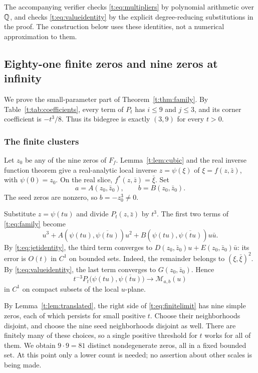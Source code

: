 \documentclass[UTF8,11pt]{ctexart}
\theoremstyle{definition}
\numberwithin{equation}{section}
\begin{document}
The accompanying verifier checks \eqref{t:eq:multipliers} by polynomial
arithmetic over $\mathbb Q$, and checks \eqref{t:eq:valueidentity} by the
explicit degree-reducing substitutions in the proof. The construction
below uses these identities, not a numerical approximation to them.

\subsection{Eighty-one finite zeros and nine zeros at infinity}\label{t:sec:construction}

We prove the small-parameter part of Theorem~\ref{t:thm:family}.
By Table~\ref{t:tab:coefficients}, every term of $P_t$ has
$i\le9$ and $j\le3$, and its corner coefficient is $-t^3/8$. Thus
its bidegree is exactly $(3,9)$ for every $t>0$.

\subsubsection{The finite clusters}
Let $z_0$ be any of the nine zeros of $F_f$. Lemma~\ref{t:lem:cubic}
and the real inverse function theorem give a real-analytic local
inverse $z=\psi(\xi)$ of $\xi=f(z,\bar z)$, with $\psi(0)=z_0$.
On the real slice, $f^*(z,\bar z)=\bar\xi$. Set
\[
 a=A(z_0,\bar z_0),\qquad b=B(z_0,\bar z_0).
\]
The seed zeros are nonzero, so $b=-z_0^3\ne0$.

Substitute $z=\psi(tu)$ and divide $P_t(z,\bar z)$ by $t^3$.
The first two terms of \eqref{t:eq:family} become
\[
 u^3+A(\psi(tu),\overline{\psi(tu)})u^2
       +B(\psi(tu),\overline{\psi(tu)})u\bar u.
\]
By \eqref{t:eq:jetidentity}, the third term converges to
$D(z_0,\bar z_0)u+E(z_0,\bar z_0)\bar u$: its error is $O(t)$
in $C^1$ on bounded sets. Indeed, the remainder belongs to
$(\xi,\bar\xi)^2$. By \eqref{t:eq:valueidentity}, the last term
converges to $G(z_0,\bar z_0)$. Hence
\begin{equation}\label{t:eq:finitelimit}
 t^{-3}P_t\bigl(\psi(tu),\overline{\psi(tu)}\bigr)
 \longrightarrow \mathcal M_{a,b}(u)
\end{equation}
in $C^1$ on compact subsets of the local $u$-plane.

By Lemma~\ref{t:lem:translated}, the right side of
\eqref{t:eq:finitelimit} has nine simple zeros, each of which persists
for small positive $t$. Choose their
neighborhoods disjoint, and choose the nine seed neighborhoods disjoint
as well. There are finitely many of these choices, so a single
positive threshold for $t$ works for all of them. We obtain
$9\cdot9=81$ distinct nondegenerate zeros, all in a fixed bounded set.
At this point only a lower count is needed; no assertion about other
scales is being made.
\end{document}
